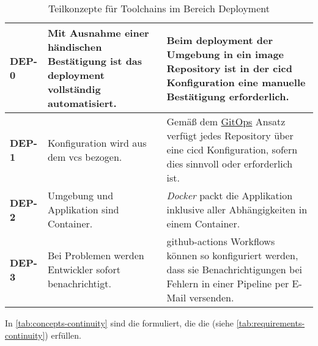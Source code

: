\begin{table}[H]
    \begin{tabular}{ >{\bfseries\ttfamily}p{} >{}p{} | >{}p{} }
        DEP-0   &   Mit Ausnahme einer händischen Bestätigung ist das \Gls{deployment} vollständig automatisiert. &
        Beim \Gls{deployment} der Umgebung in ein \Gls{image} Repository ist in der \Gls{cicd} Konfiguration eine manuelle Bestätigung erforderlich. \\
        \hline
        DEP-1   &   Konfiguration wird aus dem \Gls{vcs} bezogen. &
        Gemäß dem \hyperref[sec:03-03_gitops]{GitOps} Ansatz verfügt jedes Repository über eine \Gls{cicd} Konfiguration, sofern dies sinnvoll oder erforderlich ist. \\
        \hline
        DEP-2   &   Umgebung und Applikation sind Container. &
        \textit{Docker} packt die Applikation inklusive aller Abhängigkeiten in einem Container. \\
        \hline
        DEP-3   &   Bei Problemen werden Entwickler sofort benachrichtigt. &
        \Gls{github-actions} Workflows können  so konfiguriert werden, dass sie Benachrichtigungen bei Fehlern in einer Pipeline per E-Mail versenden. \\
    \end{tabular}
    \caption{Teilkonzepte für Toolchains im Bereich Deployment}
    \label{tab:concepts-deployment}
\end{table}

In \autoref{tab:concepts-continuity} sind die  formuliert, die die  (siehe \autoref{tab:requirements-continuity}) erfüllen.

